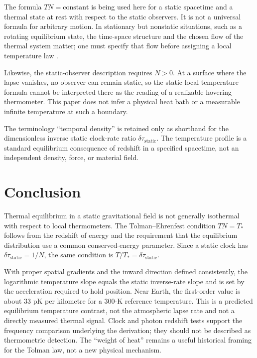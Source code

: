 \documentclass[12pt]{article}
\begin{document}
The formula $T N=\mathrm{constant}$ is being used here for a static spacetime and a thermal state at rest with respect to the static observers. It is not a universal formula for arbitrary motion. In stationary but nonstatic situations, such as a rotating equilibrium state, the time-space structure and the chosen flow of the thermal system matter; one must specify that flow before assigning a local temperature law \cite{SantiagoVisser2018}.

Likewise, the static-observer description requires $N>0$. At a surface where the lapse vanishes, no observer can remain static, so the static local temperature formula cannot be interpreted there as the reading of a realizable hovering thermometer. This paper does not infer a physical heat bath or a measurable infinite temperature at such a boundary.

The terminology ``temporal density'' is retained only as shorthand for the dimensionless inverse static clock-rate ratio $\delta\tau_{\mathrm{static}}$. The temperature profile is a standard equilibrium consequence of redshift in a specified spacetime, not an independent density, force, or material field.

\section{Conclusion}

Thermal equilibrium in a static gravitational field is not generally isothermal with respect to local thermometers. The Tolman--Ehrenfest condition $TN=T_*$ follows from the redshift of energy and the requirement that the equilibrium distribution use a common conserved-energy parameter. Since a static clock has $\delta\tau_{\mathrm{static}}=1/N$, the same condition is $T/T_*=\delta\tau_{\mathrm{static}}$.

With proper spatial gradients and the inward direction defined consistently, the logarithmic temperature slope equals the static inverse-rate slope and is set by the acceleration required to hold position. Near Earth, the first-order value is about 33 pK per kilometre for a 300-K reference temperature. This is a predicted equilibrium temperature contrast, not the atmospheric lapse rate and not a directly measured thermal signal. Clock and photon redshift tests support the frequency comparison underlying the derivation; they should not be described as thermometric detection. The ``weight of heat'' remains a useful historical framing for the Tolman law, not a new physical mechanism.
\end{document}
